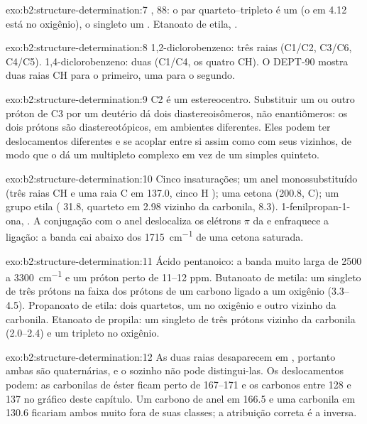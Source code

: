 \begin{solution}{exo:b2:structure-determination:7}
, 88: o par quarteto--tripleto é um  (o  em 4.12 está no oxigênio), o
singleto um . Etanoato de etila, .
\end{solution}

\begin{solution}{exo:b2:structure-determination:8}
1,2-diclorobenzeno: três raias (C1/C2, C3/C6, C4/C5). 1,4-diclorobenzeno: duas (C1/C4, os quatro
CH). O DEPT-90 mostra duas raias CH para o primeiro, uma para o segundo.
\end{solution}

\begin{solution}{exo:b2:structure-determination:9}
C2 é um estereocentro. Substituir um ou outro próton de C3 por um deutério dá dois diastereoisômeros,
não enantiômeros: os dois prótons são diastereotópicos, em ambientes diferentes. Eles podem ter
deslocamentos diferentes e se acoplar entre si assim como com seus vizinhos, de modo que o
 dá um multipleto complexo em vez de um simples quinteto.
\end{solution}

\begin{solution}{exo:b2:structure-determination:10}
Cinco insaturações; um anel monossubstituído (três raias CH e uma raia C em 137.0, cinco H );
uma cetona (200.8, C); um grupo etila ( 31.8, quarteto em 2.98 vizinho da carbonila, 
8.3). 1-fenilpropan-1-ona, . A conjugação com o anel deslocaliza os elétrons $\pi$ da
 e enfraquece a ligação: a banda cai abaixo dos \qty{1715}{cm^{-1}} de uma cetona saturada.
\end{solution}

\begin{solution}{exo:b2:structure-determination:11}
Ácido pentanoico: a banda  muito larga de 2500 a \qty{3300}{cm^{-1}} e um próton perto de 11--12
ppm. Butanoato de metila: um singleto de três prótons na faixa dos prótons de um carbono ligado a um
oxigênio (3.3--4.5). Propanoato de etila: dois quartetos, um no oxigênio e outro vizinho da carbonila.
Etanoato de propila: um singleto de três prótons vizinho da carbonila (2.0--2.4) e um tripleto no oxigênio.
\end{solution}

\begin{solution}{exo:b2:structure-determination:12}
As duas raias desaparecem em , portanto ambas são quaternárias, e o  sozinho não pode
distingui-las. Os deslocamentos podem: as carbonilas de éster ficam perto de 167--171 e os carbonos
 entre 128 e 137 no gráfico deste capítulo. Um carbono de anel em 166.5 e uma carbonila em
130.6 ficariam ambos muito fora de suas classes; a atribuição correta é a inversa.
\end{solution}

